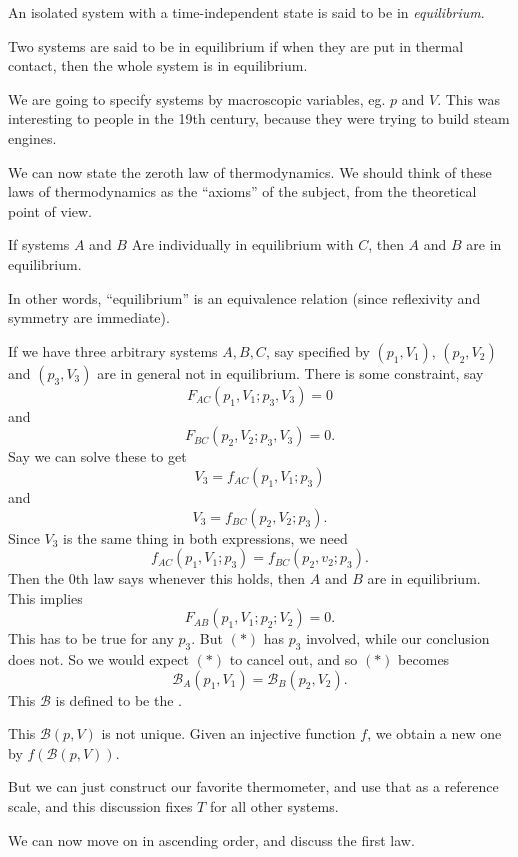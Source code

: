 \documentclass[a4paper]{article}
\begin{document}
\begin{defi}[Equilibrium]
  An isolated system with a time-independent state is said to be in \emph{equilibrium}.

  Two systems are said to be in equilibrium if when they are put in thermal contact, then the whole system is in equilibrium.
\end{defi}

We are going to specify systems by macroscopic variables, eg. $p$ and $V$. This was interesting to people in the 19th century, because they were trying to build steam engines.

We can now state the zeroth law of thermodynamics. We should think of these laws of thermodynamics as the ``axioms'' of the subject, from the theoretical point of view.

\begin{law}
  If systems $A$ and $B$ Are individually in equilibrium with $C$, then $A$ and $B$ are in equilibrium.
\end{law}
In other words, ``equilibrium'' is an equivalence relation (since reflexivity and symmetry are immediate).

If we have three arbitrary systems $A, B, C$, say specified by $(p_1, V_1)$, $(p_2, V_2)$ and $(p_3, V_3)$ are in general not in equilibrium. There is some constraint, say
\[
  F_{AC} (p_1, V_1; p_3, V_3) = 0
\]
and
\[
  F_{BC}(p_2, V_2; p_3, V_3) = 0.
\]
Say we can solve these to get
\[
  V_3 = f_{AC}(p_1, V_1; p_3)
\]
and
\[
  V_3 = f_{BC}(p_2, V_2; p_3).
\]
Since $V_3$ is the same thing in both expressions, we need
\[
  f_{AC}(p_1, V_1; p_3) = f_{BC}(p_2, v_2; p_3).\tag{$*$}
\]
Then the 0th law says whenever this holds, then $A$ and $B$ are in equilibrium. This implies
\[
  F_{AB}(p_1, V_1; p_2; V_2) = 0.
\]
This has to be true for any $p_3$. But $(*)$ has $p_3$ involved, while our conclusion does not. So we would expect $(*)$ to cancel out, and so $(*)$ becomes
\[
  \mathcal{B}_A(p_1, V_1) = \mathcal{B}_B(p_2, V_2).
\]
This $\mathcal{B}$ is defined to be the .

This $\mathcal{B}(p, V)$ is not unique. Given an injective function $f$, we obtain a new one by $f(\mathcal{B}(p, V))$.

But we can just construct our favorite thermometer, and use that as a reference scale, and this discussion fixes $T$ for all other systems.

We can now move on in ascending order, and discuss the first law.
\end{document}
